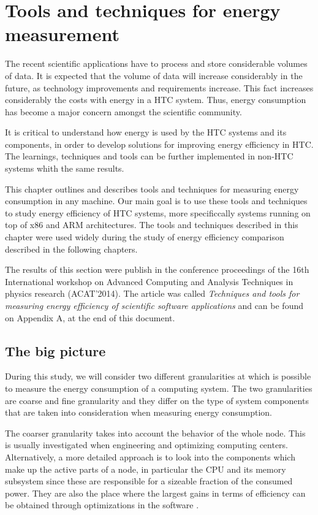 \chapter{Tools and techniques for energy measurement}


The recent scientific applications have to process and store
considerable volumes of data. It is expected that the volume of
data will increase considerably in the future, as technology improvements and
requirements increase. This fact increases considerably
the costs with energy in a HTC system. Thus, energy consumption has
become a major concern amongst the scientific community.

It is critical to understand how energy is used by the HTC systems and its components, in order to develop solutions for improving energy efficiency in HTC. The learnings, techniques and tools can be further implemented in non-HTC systems whith the same results.

This chapter outlines and describes tools and techniques for measuring energy consumption in any machine. Our main goal is to use these tools and techniques to study energy efficiency of HTC systems, more specificcally systems running on top of x86 and ARM architectures. The tools and techniques described in this chapter were used widely during the study of energy efficiency comparison described in the following chapters. 


The results of this section were publish in the conference proceedings of the 16th International workshop on Advanced Computing and Analysis Techniques in physics research (ACAT'2014). The article was called \textit{Techniques and tools for measuring energy efficiency of scientific software applications} \cite{ACAT} and can be found on Appendix A, at the end of this document. 

\section{The big picture}

During this study, we will consider two different granularities at which is possible to measure the energy consumption of a computing system. The two granularities are coarse and fine granularity and they differ on the type of system components that are taken into consideration when measuring energy consumption.

The coarser granularity takes into account the behavior of the whole node. This is usually investigated when
engineering and optimizing computing centers. Alternatively, a more detailed approach is to
look into the components which make up the active parts of a
node, in particular the CPU and its memory subsystem since these
are responsible for a sizeable fraction of the consumed power.
They are also the place where the largest gains in terms of efficiency 
can be obtained through optimizations in the software \cite{ACAT}.

